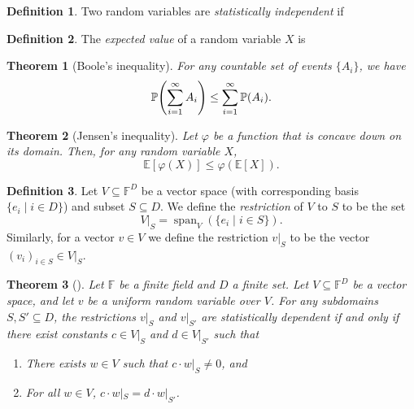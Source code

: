\documentclass[english,12pt]{reedthesis}
\theoremstyle{plain}
\newtheorem{thm}{Theorem}[section]
\theoremstyle{definition}
\newtheorem{defn}[defn]{Definition}
\theoremstyle{remark}
\DeclareMathOperator{\spn}{span}
\begin{document}
\begin{defn}\label{def:stat-indep}
  Two random variables are \emph{statistically independent} if
\end{defn}

\begin{defn}\label{def:expected-val}
  The \emph{expected value} of a random variable $X$ is
\end{defn}


\begin{thm}[{Boole's inequality}]\label{thm:boole-inequality}
  For any countable set of events $\{A_{i}\}$, we have
  \begin{equation}
    \mathbb{P}\mleft(\sum_{i=1}^{\infty}A_{i}\mright) \le \sum_{i=1}^{\infty}\mathbb{P}(A_{i}).
  \end{equation}
\end{thm}

\begin{thm}[{Jensen's inequality}]\label{thm:jensen-inequality}
  Let $\varphi$ be a function that is concave down on its domain. Then, for any random
  variable $X$,
  \begin{equation}\label{eqn:jensen-inequality}
    \mathbb{E}[\varphi(X)] \le \varphi(\mathbb{E}[X]).
  \end{equation}
\end{thm}

\begin{defn}\label{def:restrict-vs}
  Let $V \subseteq \mathbb{F}^{D}$ be a vector space (with corresponding basis
  $\{e_{i} \mid i \in D\}$) and subset $S \subseteq D$. We define the \emph{restriction} of
  $V$ to $S$ to be the set
  \begin{equation}
    V|_{S} = \spn_{V}(\{e_{i} \mid i \in S\}).
  \end{equation}
  Similarly, for a vector $v \in V$ we define the restriction $v|_{S}$ to be the
  vector $(v_{i})_{i \in S} \in V|_{S}$.
\end{defn}


\begin{thm}[{\cite[Claim 2]{CFGS22}}]\label{thm:lin-indep-stat-indep}
  Let $\mathbb{F}$ be a finite field and $D$ a finite set. Let
  $V \subseteq \mathbb{F}^{D}$ be a vector space, and let $v$ be a uniform random
  variable over $V$. For any subdomains $S, S' \subseteq D$, the restrictions $v|_{S}$
  and $v|_{S'}$ are statistically dependent if and only if there exist constants
  $c \in V|_{S}$ and $d \in V|_{S'}$ such that
  \begin{enumerate}
    \item There exists $w \in V$ such that $c \cdot w|_{S} \ne 0$, and
    \item For all $w \in V$, $c \cdot w|_{S} = d \cdot w|_{S'}$.
  \end{enumerate}
\end{thm}
\end{document}
